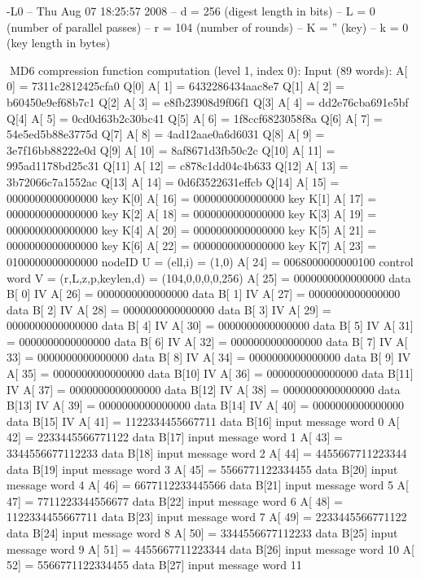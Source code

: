 -L0
-- Thu Aug 07 18:25:57 2008
-- d =    256 (digest length in bits)
-- L =      0 (number of parallel passes)
-- r =    104 (number of rounds)
-- K = '' (key)
-- k =      0 (key length in bytes)

MD6 compression function computation (level 1, index 0):
Input (89 words):
A[   0] = 7311c2812425cfa0 Q[0]
A[   1] = 6432286434aac8e7 Q[1]
A[   2] = b60450e9ef68b7c1 Q[2]
A[   3] = e8fb23908d9f06f1 Q[3]
A[   4] = dd2e76cba691e5bf Q[4]
A[   5] = 0cd0d63b2c30bc41 Q[5]
A[   6] = 1f8ccf6823058f8a Q[6]
A[   7] = 54e5ed5b88e3775d Q[7]
A[   8] = 4ad12aae0a6d6031 Q[8]
A[   9] = 3e7f16bb88222e0d Q[9]
A[  10] = 8af8671d3fb50c2c Q[10]
A[  11] = 995ad1178bd25c31 Q[11]
A[  12] = c878c1dd04c4b633 Q[12]
A[  13] = 3b72066c7a1552ac Q[13]
A[  14] = 0d6f3522631effcb Q[14]
A[  15] = 0000000000000000 key K[0]
A[  16] = 0000000000000000 key K[1]
A[  17] = 0000000000000000 key K[2]
A[  18] = 0000000000000000 key K[3]
A[  19] = 0000000000000000 key K[4]
A[  20] = 0000000000000000 key K[5]
A[  21] = 0000000000000000 key K[6]
A[  22] = 0000000000000000 key K[7]
A[  23] = 0100000000000000 nodeID U = (ell,i) = (1,0)
A[  24] = 0068000000000100 control word V = (r,L,z,p,keylen,d) = (104,0,0,0,0,256)
A[  25] = 0000000000000000 data B[ 0] IV
A[  26] = 0000000000000000 data B[ 1] IV
A[  27] = 0000000000000000 data B[ 2] IV
A[  28] = 0000000000000000 data B[ 3] IV
A[  29] = 0000000000000000 data B[ 4] IV
A[  30] = 0000000000000000 data B[ 5] IV
A[  31] = 0000000000000000 data B[ 6] IV
A[  32] = 0000000000000000 data B[ 7] IV
A[  33] = 0000000000000000 data B[ 8] IV
A[  34] = 0000000000000000 data B[ 9] IV
A[  35] = 0000000000000000 data B[10] IV
A[  36] = 0000000000000000 data B[11] IV
A[  37] = 0000000000000000 data B[12] IV
A[  38] = 0000000000000000 data B[13] IV
A[  39] = 0000000000000000 data B[14] IV
A[  40] = 0000000000000000 data B[15] IV
A[  41] = 1122334455667711 data B[16] input message word    0
A[  42] = 2233445566771122 data B[17] input message word    1
A[  43] = 3344556677112233 data B[18] input message word    2
A[  44] = 4455667711223344 data B[19] input message word    3
A[  45] = 5566771122334455 data B[20] input message word    4
A[  46] = 6677112233445566 data B[21] input message word    5
A[  47] = 7711223344556677 data B[22] input message word    6
A[  48] = 1122334455667711 data B[23] input message word    7
A[  49] = 2233445566771122 data B[24] input message word    8
A[  50] = 3344556677112233 data B[25] input message word    9
A[  51] = 4455667711223344 data B[26] input message word   10
A[  52] = 5566771122334455 data B[27] input message word   11
